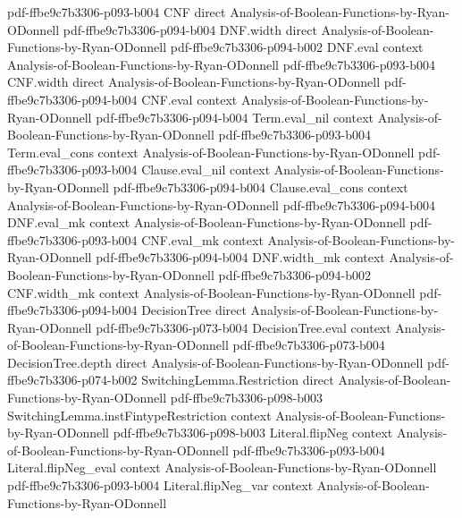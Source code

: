 \begin{lemma}
  {pdf-ffbe9c7b3306-p093-b004}
\proofstep
  {CNF}
  {direct}
  {Analysis-of-Boolean-Functions-by-Ryan-ODonnell}
  {pdf-ffbe9c7b3306-p094-b004}
\proofstep
  {DNF.width}
  {direct}
  {Analysis-of-Boolean-Functions-by-Ryan-ODonnell}
  {pdf-ffbe9c7b3306-p094-b002}
\proofstep
  {DNF.eval}
  {context}
  {Analysis-of-Boolean-Functions-by-Ryan-ODonnell}
  {pdf-ffbe9c7b3306-p093-b004}
\proofstep
  {CNF.width}
  {direct}
  {Analysis-of-Boolean-Functions-by-Ryan-ODonnell}
  {pdf-ffbe9c7b3306-p094-b004}
\proofstep
  {CNF.eval}
  {context}
  {Analysis-of-Boolean-Functions-by-Ryan-ODonnell}
  {pdf-ffbe9c7b3306-p094-b004}
\proofstep
  {Term.eval_nil}
  {context}
  {Analysis-of-Boolean-Functions-by-Ryan-ODonnell}
  {pdf-ffbe9c7b3306-p093-b004}
\proofstep
  {Term.eval_cons}
  {context}
  {Analysis-of-Boolean-Functions-by-Ryan-ODonnell}
  {pdf-ffbe9c7b3306-p093-b004}
\proofstep
  {Clause.eval_nil}
  {context}
  {Analysis-of-Boolean-Functions-by-Ryan-ODonnell}
  {pdf-ffbe9c7b3306-p094-b004}
\proofstep
  {Clause.eval_cons}
  {context}
  {Analysis-of-Boolean-Functions-by-Ryan-ODonnell}
  {pdf-ffbe9c7b3306-p094-b004}
\proofstep
  {DNF.eval_mk}
  {context}
  {Analysis-of-Boolean-Functions-by-Ryan-ODonnell}
  {pdf-ffbe9c7b3306-p093-b004}
\proofstep
  {CNF.eval_mk}
  {context}
  {Analysis-of-Boolean-Functions-by-Ryan-ODonnell}
  {pdf-ffbe9c7b3306-p094-b004}
\proofstep
  {DNF.width_mk}
  {context}
  {Analysis-of-Boolean-Functions-by-Ryan-ODonnell}
  {pdf-ffbe9c7b3306-p094-b002}
\proofstep
  {CNF.width_mk}
  {context}
  {Analysis-of-Boolean-Functions-by-Ryan-ODonnell}
  {pdf-ffbe9c7b3306-p094-b004}
\proofstep
  {DecisionTree}
  {direct}
  {Analysis-of-Boolean-Functions-by-Ryan-ODonnell}
  {pdf-ffbe9c7b3306-p073-b004}
\proofstep
  {DecisionTree.eval}
  {context}
  {Analysis-of-Boolean-Functions-by-Ryan-ODonnell}
  {pdf-ffbe9c7b3306-p073-b004}
\proofstep
  {DecisionTree.depth}
  {direct}
  {Analysis-of-Boolean-Functions-by-Ryan-ODonnell}
  {pdf-ffbe9c7b3306-p074-b002}
\proofstep
  {SwitchingLemma.Restriction}
  {direct}
  {Analysis-of-Boolean-Functions-by-Ryan-ODonnell}
  {pdf-ffbe9c7b3306-p098-b003}
\proofstep
  {SwitchingLemma.instFintypeRestriction}
  {context}
  {Analysis-of-Boolean-Functions-by-Ryan-ODonnell}
  {pdf-ffbe9c7b3306-p098-b003}
\proofstep
  {Literal.flipNeg}
  {context}
  {Analysis-of-Boolean-Functions-by-Ryan-ODonnell}
  {pdf-ffbe9c7b3306-p093-b004}
\proofstep
  {Literal.flipNeg_eval}
  {context}
  {Analysis-of-Boolean-Functions-by-Ryan-ODonnell}
  {pdf-ffbe9c7b3306-p093-b004}
\proofstep
  {Literal.flipNeg_var}
  {context}
  {Analysis-of-Boolean-Functions-by-Ryan-ODonnell}

\end{lemma}
